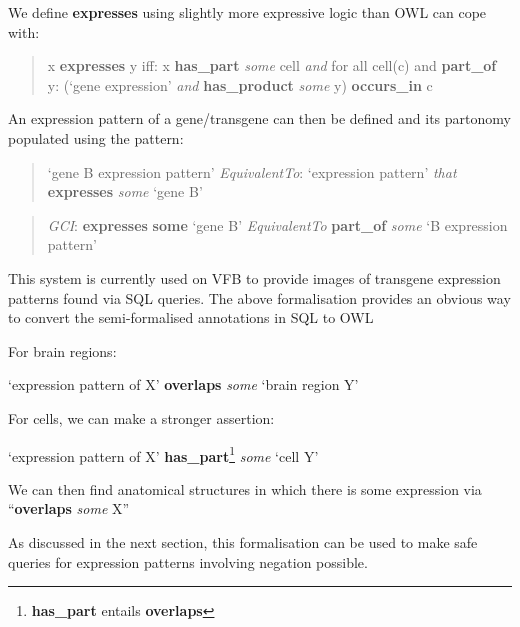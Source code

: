\documentclass[runningheads,a4paper]{llncs}
\begin{document}
We define \textbf{expresses} using slightly more expressive logic than OWL can
cope with:

\begin{quote}
x \textbf{expresses} y iff:  x \textbf{has\_part} \textit{some} cell \textit{and}
for all cell(c) and \textbf{part\_of} y: (`gene expression'
\textit{and} \textbf{has\_product} \textit{some} y)
\textbf{occurs\_in} c  %
\end{quote}

An expression pattern of a gene/transgene can then be defined and its
partonomy populated using the pattern:

\begin{quote}
`gene B expression pattern'
\textit{EquivalentTo}: `expression pattern' \textit{that} \textbf{expresses} \textit{some} `gene
B'\end{quote}
\begin{quote} \textit{GCI}: \textbf{expresses} \textbf{some} `gene B' \textit{EquivalentTo}
\textbf{part\_of} \textit{some} `B expression pattern'
\end{quote}


This system is currently used on VFB to provide images of transgene
expression patterns found via SQL queries. The above formalisation
provides an obvious way to convert the semi-formalised annotations in
SQL to OWL

For brain regions:

`expression pattern of X' \textbf{overlaps} \textit{some} `brain region Y'

For cells, we can make a stronger assertion:

`expression pattern of X'
\textbf{has\_part}\footnote{\textbf{has\_part} entails \textbf{overlaps}} \textit{some} `cell Y'

We can then find anatomical structures in which there is some
expression via ``\textbf{overlaps} \textit{some} X''

As discussed in the next section, this formalisation can be used to
make safe queries for expression patterns involving negation possible.


\end{document}
